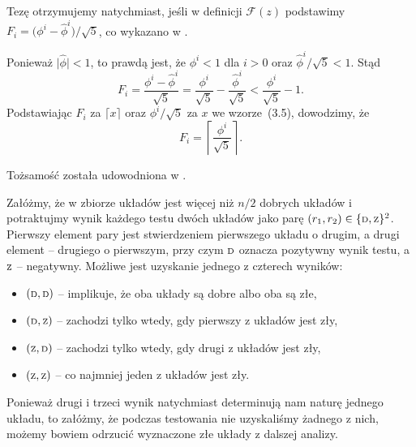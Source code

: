 \subexercise{} %
Tezę otrzymujemy natychmiast, jeśli w definicji $\mathcal{F}(z)$ podstawimy $F_i=\bigl(\phi^i-\widehat\phi^i\bigr)/\sqrt{5}$, co wykazano w .

\subexercise{} %
Ponieważ $\bigl|\widehat\phi\bigr|<1$, to prawdą jest, że $\phi^i<1$ dla $i>0$ oraz $\widehat\phi^i/\sqrt{5}<1$. Stąd
\[
	F_i = \frac{\phi^i-\widehat\phi^i}{\sqrt{5}} = \frac{\phi^i}{\sqrt{5}}-\frac{\widehat\phi^i}{\sqrt{5}} < \frac{\phi^i}{\sqrt{5}}-1.
\]
Podstawiając $F_i$ za $\lceil x\rceil$ oraz $\phi^i/\sqrt{5}$ za $x$ we wzorze~(3.5), dowodzimy, że
\[
	F_i = \left\lceil\frac{\phi^i}{\sqrt{5}}\right\rceil.
\]

\subexercise{} %
Tożsamość została udowodniona w .


\subexercise{} %
Załóżmy, że w zbiorze układów jest więcej niż $n/2$ dobrych układów i potraktujmy wynik każdego testu dwóch układów jako parę $(r_1,r_2)\in\{{\scriptstyle\rm D},{\scriptstyle\rm Z}\}^2$. Pierwszy element pary jest stwierdzeniem pierwszego układu o drugim, a drugi element -- drugiego o pierwszym, przy czym ${\scriptstyle\rm D}$ oznacza pozytywny wynik testu, a~${\scriptstyle\rm Z}$ -- negatywny. Możliwe jest uzyskanie jednego z czterech wyników:
\begin{itemize}
	\item $({\scriptstyle\rm D},{\scriptstyle\rm D})$ -- implikuje, że oba układy są dobre albo oba są złe,
	\item $({\scriptstyle\rm D},{\scriptstyle\rm Z})$ -- zachodzi tylko wtedy, gdy pierwszy z układów jest zły,
	\item $({\scriptstyle\rm Z},{\scriptstyle\rm D})$ -- zachodzi tylko wtedy, gdy drugi z układów jest zły,
	\item $({\scriptstyle\rm Z},{\scriptstyle\rm Z})$ -- co najmniej jeden z układów jest zły.
\end{itemize}
Ponieważ drugi i trzeci wynik natychmiast determinują nam naturę jednego układu, to załóżmy, że podczas testowania nie uzyskaliśmy żadnego z nich, możemy bowiem odrzucić wyznaczone złe układy z dalszej analizy.

